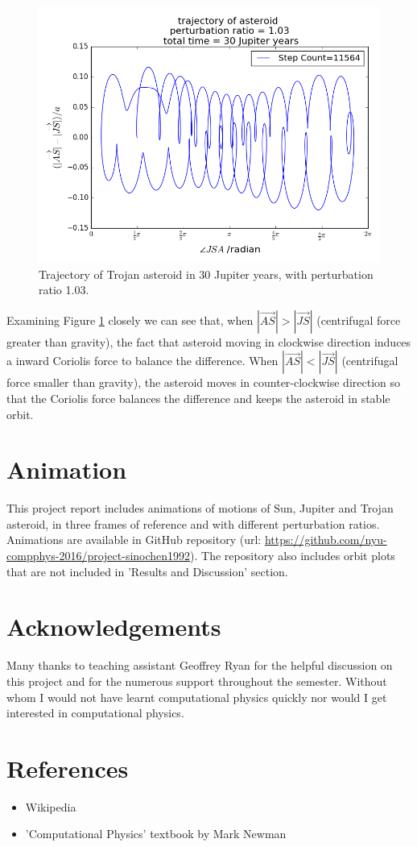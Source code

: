 \documentclass[12pt,a4paper]{article}
\begin{document}
\begin{figure}[H]
\centering
\includegraphics[width=5.5in]{figure_4_103v_30orbits.png}
\caption{Trajectory of Trojan asteroid in 30 Jupiter years, with perturbation ratio 1.03.}
\label{fig:figure_4_103v_30orbits}
\end{figure}

Examining Figure \ref{fig:figure_4_103v_30orbits} closely we can see that, when $|\overrightarrow{AS}| > |\overrightarrow{JS}|$ (centrifugal force greater than gravity), the fact that asteroid moving in clockwise direction induces a inward Coriolis force to balance the difference. When $|\overrightarrow{AS}| < |\overrightarrow{JS}|$ (centrifugal force smaller than gravity), the asteroid moves in counter-clockwise direction so that the Coriolis force balances the difference and keeps the asteroid in stable orbit.

\section{Animation}
This project report includes animations of motions of Sun, Jupiter and Trojan asteroid, in three frames of reference and with different perturbation ratios. Animations are available in GitHub repository (url: \url{https://github.com/nyu-compphys-2016/project-sinochen1992}).  The repository also includes orbit plots that are not included in 'Results and Discussion' section.

\section{Acknowledgements}
Many thanks to teaching assistant Geoffrey Ryan for the helpful discussion on this project and for the numerous support throughout the semester. Without whom I would not have learnt computational physics quickly nor would I get interested in computational physics.

\section{References}
\begin{itemize}
\item Wikipedia
\item 'Computational Physics' textbook by Mark Newman 
\end{itemize}
\end{document}
